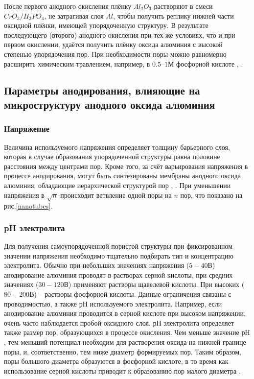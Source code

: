 После первого анодного окисления плёнку $Al_2O_3$ растворяют в смеси $CrO_3/H_3PO_4$, не затрагивая слоя $Al$, чтобы получить реплику нижней части оксидной плёнки, имеющей упорядоченную структуру. В результате последующего (второго) анодного окисления при тех же условиях, что и при первом окислении, удаётся получить плёнку оксида алюминия с высокой степенью упорядочения пор. При необходимости поры можно равномерно расширить химическим травлением, например, в $0.5 – 1\text{М}$ фосфорной кислоте \cite{napolsky-sintez}, \cite{petukhov}.

\subsection{Параметры анодирования, влияющие на микроструктуру анодного оксида алюминия}

\subsubsection{Напряжение}

Величина используемого напряжения определяет толщину барьерного слоя, которая в случае образования упорядоченной структуры равна половине расстояния между центрами пор. Кроме того, за счёт варьирования напряжения в процессе анодирования, могут быть синтезированы мембраны анодного оксида алюминия, обладающие иерархической структурой пор \cite{sacco},  \cite{meng-nanowires}. При уменьшении напряжения в $\sqrt n$ происходит ветвление одной поры на $n$ пор, что показано на рис.\ref{nanotubes}.


\subsubsection{pH электролита}

Для получения самоупорядоченной пористой структуры при фиксированном значении напряжения необходимо тщательно подбирать тип и концентрацию электролита. Обычно при небольших значениях напряжения ($5-40\text{В}$) анодирование алюминия проводят в растворах серной кислоты, при средних значениях ($30-120В$) применяют растворы щавелевой кислоты. При высоких ($80-200\text{В}$) – растворы фосфорной кислоты. Данные ограничения связаны с проводимостью, а также $рН$ используемого электролита. Например, если анодирование алюминия проводится в серной кислоте при высоком напряжении, очень часто наблюдается пробой оксидного слоя. $рН$ электролита определяет также размер пор, образующихся в процессе окисления. Чем меньше значение $рН$, тем меньший потенциал необходим для растворения оксида на нижней границе поры, и, соответственно, тем ниже диаметр формируемых пор. Таким образом, поры большого диаметра образуются в фосфорной кислоте, в то время как использование серной кислоты приводит к образованию пор малого диаметра \cite{napolsky-sintez}.

